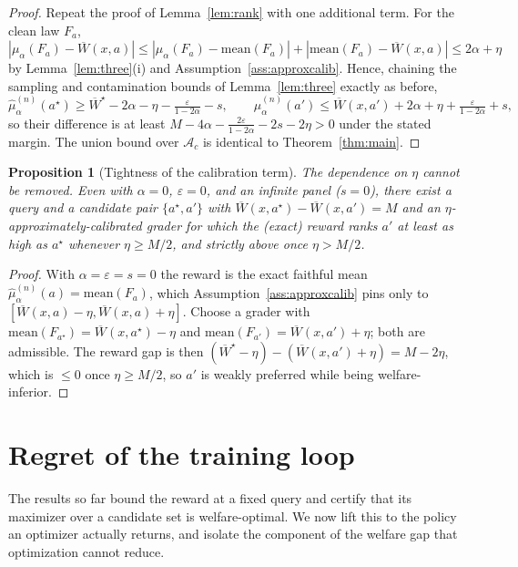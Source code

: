 \documentclass[11pt]{article}
\theoremstyle{plain}
\newtheorem{proposition}{Proposition}
\theoremstyle{definition}
\theoremstyle{remark}
\newcommand{\Ac}{\mathcal{A}}
\newcommand{\Wbar}{\overline{W}}
\newcommand{\eps}{\varepsilon}
\begin{document}
\begin{proof}
Repeat the proof of Lemma~\ref{lem:rank} with one additional term. For the clean law $F_a$,
$|\mu_\alpha(F_a)-\Wbar(x,a)|\le|\mu_\alpha(F_a)-\mathrm{mean}(F_a)|+|\mathrm{mean}(F_a)-\Wbar(x,a)|\le2\alpha+\eta$
by Lemma~\ref{lem:three}(i) and Assumption~\ref{ass:approxcalib}. Hence, chaining the sampling and
contamination bounds of Lemma~\ref{lem:three} exactly as before,
\[
  \hat\mu_\alpha^{(n)}(a^\star)\ge\Wbar^\star-2\alpha-\eta-\tfrac{\eps}{1-2\alpha}-s,
  \qquad
  \hat\mu_\alpha^{(n)}(a')\le\Wbar(x,a')+2\alpha+\eta+\tfrac{\eps}{1-2\alpha}+s,
\]
so their difference is at least $M-4\alpha-\frac{2\eps}{1-2\alpha}-2s-2\eta>0$ under the stated
margin. The union bound over $\Ac_c$ is identical to Theorem~\ref{thm:main}.
\end{proof}

\begin{proposition}[Tightness of the calibration term]
\label{prop:calibtight}
The dependence on $\eta$ cannot be removed. Even with $\alpha=0$, $\eps=0$, and an infinite panel
($s=0$), there exist a query and a candidate pair $\{a^\star,a'\}$ with
$\Wbar(x,a^\star)-\Wbar(x,a')=M$ and an $\eta$-approximately-calibrated grader for which the
\textup{(exact)} reward ranks $a'$ at least as high as $a^\star$ whenever $\eta\ge M/2$, and
strictly above once $\eta>M/2$.
\end{proposition}

\begin{proof}
With $\alpha=\eps=s=0$ the reward is the exact faithful mean
$\hat\mu_\alpha^{(n)}(a)=\mathrm{mean}(F_a)$, which Assumption~\ref{ass:approxcalib} pins only to
$[\Wbar(x,a)-\eta,\Wbar(x,a)+\eta]$. Choose a grader with
$\mathrm{mean}(F_{a^\star})=\Wbar(x,a^\star)-\eta$ and
$\mathrm{mean}(F_{a'})=\Wbar(x,a')+\eta$; both are admissible. The reward gap is then
$(\Wbar^\star-\eta)-(\Wbar(x,a')+\eta)=M-2\eta$, which is $\le0$ once $\eta\ge M/2$, so $a'$ is
weakly preferred while being welfare-inferior.
\end{proof}

\section{Regret of the training loop}
\label{sec:regret}

The results so far bound the reward at a fixed query and certify that its maximizer over a
candidate set is welfare-optimal. We now lift this to the policy an optimizer actually returns,
and isolate the component of the welfare gap that optimization cannot reduce.
\end{document}
